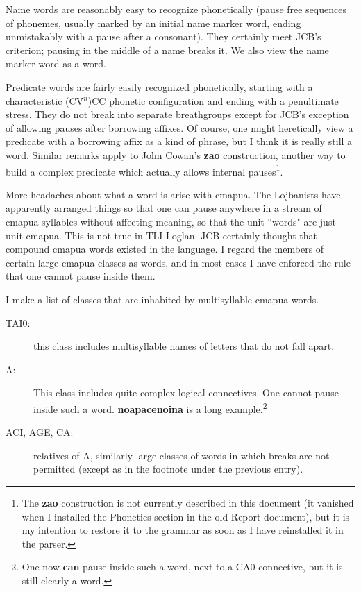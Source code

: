 \documentclass[12pt]{book}
\begin{document}
{Name words are reasonably easy to recognize phonetically (pause free sequences of phonemes, usually marked by an initial name marker word, ending
unmistakably with a pause after a consonant).  They certainly meet JCB's criterion; pausing in the middle of a name breaks it.   We also view the name marker word as a word.

Predicate words are fairly easily recognized phonetically, starting with a characteristic (CV$^n$)CC phonetic configuration and ending with a penultimate stress.  They do not break into separate breathgroups except for JCB's exception of allowing pauses after borrowing affixes.  Of course, one might heretically view a predicate with a borrowing affix as a kind of phrase, but I think it is really still a word.   Similar remarks apply to 
John Cowan's {\bf zao} construction, another way to build a complex predicate which actually allows internal pauses\footnote{The {\bf zao} construction is not currently described in this document (it vanished when I installed the Phonetics section in the old Report document), but it is my intention to restore it to the grammar as soon as I have reinstalled it in the parser.}.

More headaches about what a word is arise with cmapua.   The Lojbanists have apparently arranged things so that one can pause anywhere in a stream of cmapua syllables without affecting meaning, so that the unit ``words" are just unit cmapua.  This is not true in TLI Loglan.   JCB certainly thought that compound cmapua words existed in the language.  I regard the members of certain large cmapua classes as words, and in most cases
I have enforced the rule that one cannot pause inside them.  

I make a list of classes that are inhabited by multisyllable cmapua words.

\begin{description}

\item[TAI0:]  this class includes multisyllable names of letters that do not fall apart.

\item[A:]  This class includes quite complex logical connectives.  One cannot pause inside such a word.  {\bf noapacenoina} is a long example.\footnote{One now {\bf can} pause inside such a word, next to a CA0 connective, but it is still clearly a word.}

\item[ACI, AGE, CA:]  relatives of A, similarly large classes of words in which breaks are not permitted (except as in the footnote under the previous entry).


\end{description}}
\end{document}
